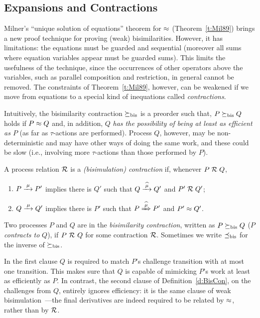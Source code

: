 \subsection{Expansions and Contractions}
\label{s:mcontr}

Milner's ``unique solution of equations'' theorem for $\approx$
(Theorem~\ref{t:Mil89})
brings a new proof technique for proving (weak) bisimilarities. However, it has
 limitations: the equations must be guarded and sequential (moreover
all sums where equation variables appear must be guarded sums).
This limits the usefulness of the technique, since
the occurrences of other operators above the variables, such as parallel
composition and restriction, in general cannot be removed.
The constraints of Theorem~\ref{t:Mil89}, however, can be 
weakened if we move from equations to a special kind of inequations called
  \emph{contractions}.

Intuitively, the bisimilarity contraction $\mathrel{\succeq_{\rm{bis}}}$ is a preorder
such that, $P \mathrel{\succeq_{\rm{bis}}} Q$ holds if $P \approx Q$ and, in addition, 
$Q$ \emph{has the possibility of being at least as efficient as $P$} (as far as
$\tau$-actions are performed).
Process $Q$, however, may be non-deterministic and may have other ways
of doing the same work, and these could be slow (i.e., involving
more $\tau$-actions than those performed by $P$).

\begin{definition}[contraction]
\label{d:BisCon}
A process relation ${{\cal R}}$ 
 is a \emph{(bisimulation) contraction} if, whenever
 $P\mathrel{\cal R} Q$, %

\begin{enumerate}
\item   $P \arr\mu P'$ implies there is $Q'$ such that $Q \arcap \mu
  Q'$ and $P' \mathrel{\cal R} Q'$;
\item $Q \arr\mu Q'$   implies there is $P'$ such that $P \Arcap \mu
 P'$ and $P' \approx Q'$\enspace.
\end{enumerate}
Two processes $P$ and $Q$ are in the \emph{bisimilarity
contraction}, written as $P \mathrel{\succeq_{\rm{bis}}} Q$ ($P$ \emph{contracts to} $Q$),
if $P\ {\cal R}\ Q$ for some contraction ${\cal R}$.
Sometimes we write $\mathrel{\preceq_{\rm{bis}}}$ for the inverse of $\mathrel{\succeq_{\rm{bis}}}$.
\end{definition}

In the first clause $Q$ is required to match $P$'s challenge
transition with at most one transition.
This makes sure that $Q$ is capable of mimicking %
$P$'s work at least as efficiently as $P$. 
In contrast, the second clause of Definition~\ref{d:BisCon}, on the
challenges from $Q$, entirely ignores efficiency: it is the same
clause of  weak bisimulation~---the final derivatives are indeed required
to be related  by $\approx$, rather than by ${\cal R}$.

